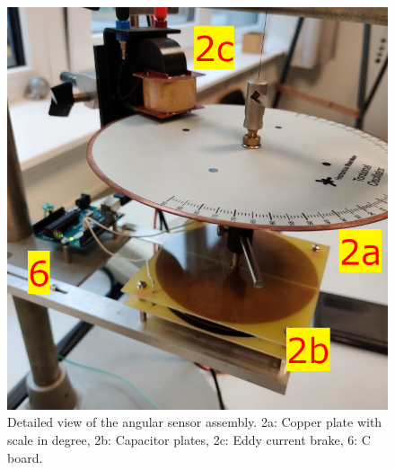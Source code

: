 	\par
	\begin{figure}[h]
		\centering
		\includegraphics[width=.5\textwidth]{aufbau/setup_pendulum_side_num.jpg}
		\caption[Equipment in detail.]{ Detailed view of the angular sensor assembly. 2a: Copper plate with scale in degree, 2b: Capacitor plates, 2c: Eddy current brake,
		6: \micro C board.}
		\label{fig:setup_detailed}
	\end{figure}
